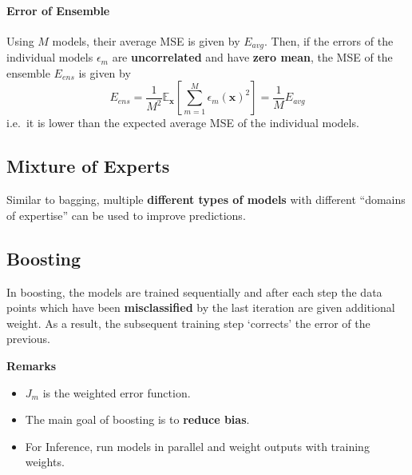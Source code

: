 \paragraph{Error of Ensemble}
Using $M$ models, their average MSE is given by $E_{avg}$.
Then, if the errors of the individual models $\epsilon_m$ are \textbf{uncorrelated} and have \textbf{zero mean}, the MSE of the ensemble $E_{ens}$ is given by
\noindent\begin{equation*}
    E_{ens} = \frac{1}{M^2}\mathbb{E}_{\mathbf{x}} \left[\sum_{m=1}^{M} {\epsilon_m(\mathbf{x})}^2\right] = \frac{1}{M} E_{avg}
\end{equation*}
i.e.\ it is lower than the expected average MSE of the individual models.

\subsection{Mixture of Experts}
Similar to bagging, multiple \textbf{different types of models} with different ``domains of expertise'' can be used to improve predictions.

\subsection{Boosting}
In boosting, the models are trained sequentially and after each step the data points which have been \textbf{misclassified} by the last iteration are given additional weight.
As a result, the subsequent training step `corrects' the error of the previous.


\textbf{Remarks}
\begin{itemize}
    \item $J_m$ is the weighted error function.
    \item The main goal of boosting is to \textbf{reduce bias}.
    \item For Inference, run models in parallel and weight outputs with training weights.
\end{itemize}